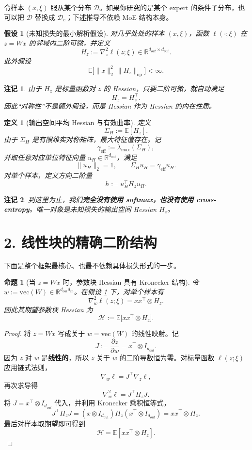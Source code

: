 \documentclass[11pt]{ctexart}
\newtheorem{proposition}{命题}
\newtheorem{definition}{定义}
\newtheorem{remark}{注记}
\newtheorem{assumption}{假设}
\begin{document}
令样本 $(x,\xi)$ 服从某个分布 $\mathcal{D}$。如果你研究的是某个 expert 的条件子分布，也可以把 $\mathcal{D}$ 替换成 $\mathcal{D}_e$；下述推导不依赖 MoE 结构本身。

\begin{assumption}[未知损失的最小解析假设]\label{ass:basic_loss}
对几乎处处的样本 $(x,\xi)$，函数 $\ell(\cdot;\xi)$ 在 $z=Wx$ 的邻域内二阶可微，并定义
\[
H_z := \nabla_z^2 \ell(z;\xi) \in \mathbb{R}^{d_{out}\times d_{out}}.
\]
此外假设
\[
\mathbb{E}\big[\|x\|_2^2 \, \|H_z\|_{\mathrm{op}}\big] < \infty.
\]
\end{assumption}

\begin{remark}
由于 $H_z$ 是标量函数对 $z$ 的 Hessian，只要二阶可微，就自动满足
\[
H_z = H_z^\top.
\]
因此“对称性”不是额外假设，而是 Hessian 作为 Hessian 的内在性质。
\end{remark}

\begin{definition}[输出空间平均 Hessian 与有效曲率]
定义
\[
\Sigma_H := \mathbb{E}[H_z].
\]
由于 $\Sigma_H$ 是有限维实对称矩阵，最大特征值存在。记
\[
\gamma_{\mathrm{eff}} := \lambda_{\max}(\Sigma_H),
\]
并取任意对应单位特征向量 $u_H \in \mathbb{R}^{d_{out}}$，满足
\[
\|u_H\|_2 = 1, \qquad \Sigma_H u_H = \gamma_{\mathrm{eff}} u_H.
\]
对单个样本，定义方向二阶量
\[
h := u_H^\top H_z u_H.
\]
\end{definition}

\begin{remark}
到这里为止，我们\textbf{完全没有使用 softmax，也没有使用 cross-entropy}。唯一对象是未知损失的输出空间 Hessian $H_z$。
\end{remark}

\section*{2. 线性块的精确二阶结构}

下面是整个框架最核心、也最不依赖具体损失形式的一步。

\begin{proposition}[当 $z=Wx$ 时，参数块 Hessian 具有 Kronecker 结构]\label{prop:exact_hessian}
令 $w := \mathrm{vec}(W) \in \mathbb{R}^{d_{out}d_{in}}$。在假设 \ref{ass:basic_loss} 下，对单个样本有
\[
\nabla_w^2 \ell(z;\xi) = xx^\top \otimes H_z.
\]
因此其期望参数块 Hessian 为
\[
\mathcal{H} := \mathbb{E}\big[xx^\top \otimes H_z\big].
\]
\end{proposition}

\begin{proof}
将 $z = Wx$ 写成关于 $w = \mathrm{vec}(W)$ 的线性映射。记
\[
J := \frac{\partial z}{\partial w} = x^\top \otimes I_{d_{out}}.
\]
因为 $z$ 对 $w$ 是\textbf{线性的}，所以 $z$ 关于 $w$ 的二阶导数恒为零。对标量函数 $\ell(z;\xi)$ 应用链式法则，
\[
\nabla_w \ell = J^\top \nabla_z \ell,
\]
再次求导得
\[
\nabla_w^2 \ell = J^\top H_z J.
\]
将 $J = x^\top \otimes I_{d_{out}}$ 代入，并利用 Kronecker 乘积恒等式，
\[
J^\top H_z J
= (x \otimes I_{d_{out}}) H_z (x^\top \otimes I_{d_{out}})
= xx^\top \otimes H_z.
\]
最后对样本取期望即可得到
\[
\mathcal{H} = \mathbb{E}[xx^\top \otimes H_z].
\]
\end{proof}
\end{document}
